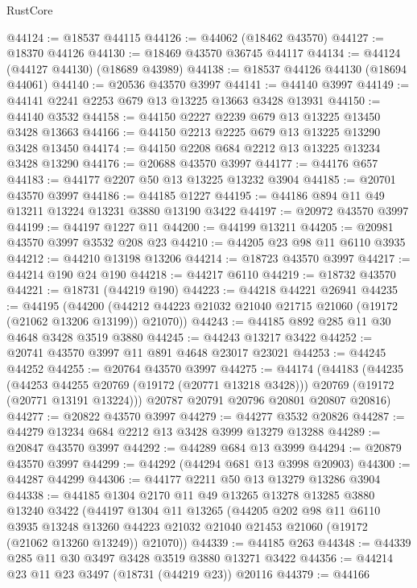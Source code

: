 \begin{lexlean}{RustCore}
\begin{coremodule}
@44124 := @18537 @44115
@44126 := @44062 (@18462 @43570)
@44127 := @18370 @44126
@44130 := @18469 @43570 @36745 @44117
@44134 := @44124 (@44127 @44130) (@18689 @43989)
@44138 := @18537 @44126 @44130 (@18694 @44061)
@44140 := @20536 @43570 @3997
@44141 := @44140 @3997
@44149 := @44141 @2241 @2253 @679 @13 @13225 @13663 @3428 @13931
@44150 := @44140 @3532
@44158 := @44150 @2227 @2239 @679 @13 @13225 @13450 @3428 @13663
@44166 := @44150 @2213 @2225 @679 @13 @13225 @13290 @3428 @13450
@44174 := @44150 @2208 @684 @2212 @13 @13225 @13234 @3428 @13290
@44176 := @20688 @43570 @3997
@44177 := @44176 @657
@44183 := @44177 @2207 @50 @13 @13225 @13232 @3904
@44185 := @20701 @43570 @3997
@44186 := @44185 @1227
@44195 := @44186 @894 @11 @49 @13211 @13224 @13231 @3880 @13190 @3422
@44197 := @20972 @43570 @3997
@44199 := @44197 @1227 @11
@44200 := @44199 @13211
@44205 := @20981 @43570 @3997 @3532 @208 @23
@44210 := @44205 @23 @98 @11 @6110 @3935
@44212 := @44210 @13198 @13206
@44214 := @18723 @43570 @3997
@44217 := @44214 @190 @24 @190
@44218 := @44217 @6110
@44219 := @18732 @43570
@44221 := @18731 (@44219 @190)
@44223 := @44218 @44221 @26941
@44235 := @44195
    (@44200 (@44212 @44223 @21032 @21040 @21715 @21060 (@19172 (@21062 @13206 @13199)) @21070))
@44243 := @44185 @892 @285 @11 @30 @4648 @3428 @3519 @3880
@44245 := @44243 @13217 @3422
@44252 := @20741 @43570 @3997 @11 @891 @4648 @23017 @23021
@44253 := @44245 @44252
@44255 := @20764 @43570 @3997
@44275 := @44174
    (@44183
      (@44235
        (@44253 @44255 @20769 (@19172 (@20771 @13218 @3428)))
        @20769
        (@19172 (@20771 @13191 @13224)))
      @20787
      @20791
      @20796
      @20801
      @20807
      @20816)
@44277 := @20822 @43570 @3997
@44279 := @44277 @3532 @20826
@44287 := @44279 @13234 @684 @2212 @13 @3428 @3999 @13279 @13288
@44289 := @20847 @43570 @3997
@44292 := @44289 @684 @13 @3999
@44294 := @20879 @43570 @3997
@44299 := @44292 (@44294 @681 @13 @3998 @20903)
@44300 := @44287 @44299
@44306 := @44177 @2211 @50 @13 @13279 @13286 @3904
@44338 := @44185
    @1304
    @2170
    @11
    @49
    @13265
    @13278
    @13285
    @3880
    @13240
    @3422
    (@44197
      @1304
      @11
      @13265
      (@44205
        @202
        @98
        @11
        @6110
        @3935
        @13248
        @13260
        @44223
        @21032
        @21040
        @21453
        @21060
        (@19172 (@21062 @13260 @13249))
        @21070))
@44339 := @44185 @263
@44348 := @44339 @285 @11 @30 @3497 @3428 @3519 @3880 @13271 @3422
@44356 := @44214 @23 @11 @23 @3497 (@18731 (@44219 @23)) @20116
@44379 := @44166

\end{coremodule}
\end{lexlean}
